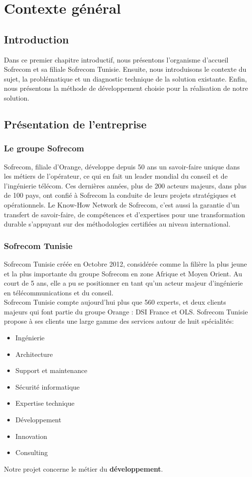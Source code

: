 \chapter{Contexte général}
\section*{Introduction}
Dans ce premier chapitre introductif, nous présentons l’organisme d’accueil Sofrecom et sa filiale Sofrecom Tunisie. Ensuite, nous introduisons le contexte du sujet, la problématique et un diagnostic technique de la solution existante. Enfin, nous présentons la méthode de développement choisie pour la réalisation de notre solution.

\section[Présentation de l’entreprise]{Présentation de l’entreprise}

\subsection[Le groupe Sofrecom]{Le groupe Sofrecom}
Sofrecom, filiale d’Orange, développe depuis 50 ans un savoir-faire unique dans les métiers de l’opérateur, ce qui en fait un leader mondial du conseil et de l’ingénierie télécom. Ces dernières années, plus de 200 acteurs majeurs, dans plus de 100 pays, ont confié à Sofrecom la conduite de leurs projets stratégiques et opérationnels. Le Know-How Network de Sofrecom, c’est aussi la garantie d’un transfert de savoir-faire, de compétences et d’expertises pour une transformation durable s’appuyant sur des méthodologies certifiées au niveau international.
\subsection{Sofrecom Tunisie}
Sofrecom Tunisie créée en Octobre 2012, considérée comme la filière la plus jeune et la plus importante du groupe Sofrecom en zone Afrique et Moyen Orient. Au court de 5 ans, elle a pu se positionner en tant qu’un acteur majeur  d’ingénierie en télécommunications et du conseil.\\
Sofrecom Tunisie compte aujourd’hui plus que 560 experts, et deux clients majeurs qui font partie du groupe Orange : DSI France et OLS. Sofrecom Tunisie propose à ses clients une large  gamme des services autour de huit spécialités:
\begin{itemize}
	\item Ingénierie
	\item Architecture
	\item Support et maintenance
	\item Sécurité informatique
	\item Expertise technique
	\item Développement
	\item Innovation 
	\item Consulting
\end{itemize}
Notre projet concerne le métier du \textbf{développement}.
